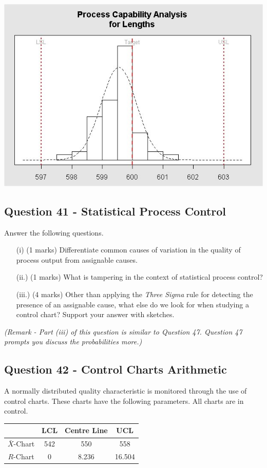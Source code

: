 \documentclass[a4paper,12pt]{article}
\begin{document}
\begin{center}
	\includegraphics[scale=0.55]{images/ExamQ4hist}
\end{center}
\newpage
%
%
%

\subsection*{Question 41 - Statistical Process Control}
Answer the following questions.

\begin{itemize}
	\item[(i)] (1 marks) Differentiate common causes of variation in the quality of process output from assignable causes.
	\item[(ii.)] (1 marks) What is tampering in the context of statistical process control?
	\item[(iii.)] (4 marks) Other than applying the \emph{Three Sigma} rule for detecting the presence of an assignable cause, what else do we look for when studying a control chart? Support your answer with sketches.
\end{itemize}
\textit{(Remark - Part (iii) of this question is similar to Question 47. Question 47 prompts you discuss the probabilities more.)}
\subsection*{Question 42 - Control Charts Arithmetic}

A normally distributed quality characteristic is monitored through the use of control charts. These charts have the following parameters. All charts are in control.
\begin{center}
	\begin{tabular}{|c|c|c|c|}
		\hline  & LCL & Centre Line & UCL \\
		\hline $\bar{X}$-Chart & 542 & 550 & 558 \\
		\hline $R$-Chart & 0 & 8.236 & 16.504 \\ \hline
	\end{tabular}
\end{center}
\end{document}
